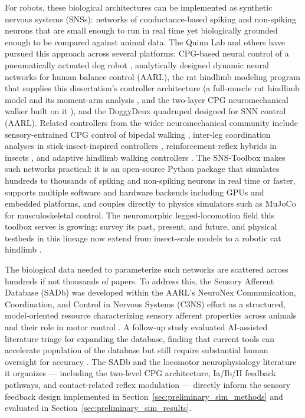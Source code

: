 For robots, these biological architectures can be implemented as synthetic nervous systems (SNSs): networks of conductance-based spiking and non-spiking neurons that are small enough to run in real time yet biologically grounded enough to be compared against animal data. The Quinn Lab and others have pursued this approach across several platforms: CPG-based neural control of a pneumatically actuated dog robot \citep{hunt_development_2017}, analytically designed dynamic neural networks for human balance control \citep{hilts_dynamic_2019}(AARL), the rat hindlimb modeling program that supplies this dissertation's controller architecture (a full-muscle rat hindlimb model and its moment-arm analysis \citep{young_analyzing_2019}, and the two-layer CPG neuromechanical walker built on it \citep{deng_neuromechanical_2019}), and the DoggyDeux quadruped designed for SNN control \citep{scharzenberger_design_2019}(AARL). Related controllers from the wider neuromechanical community include sensory-entrained CPG control of bipedal walking \citep{li_bipedal_2017}, inter-leg coordination analyses in stick-insect-inspired controllers \citep{nourse_analyzing_2019}, reinforcement-reflex hybrids in insects \citep{goldsmith_investigating_2021}, and adaptive hindlimb walking controllers \citep{schilling_adaptive_2022}. The SNS-Toolbox \citep{nourse_sns_2023} makes such networks practical: it is an open-source Python package that simulates hundreds to thousands of spiking and non-spiking neurons in real time or faster, supports multiple software and hardware backends including GPUs and embedded platforms, and couples directly to physics simulators such as MuJoCo for musculoskeletal control. The neuromorphic legged-locomotion field this toolbox serves is growing: \citet{szczecinski_perspective_2023} survey its past, present, and future, and physical testbeds in this lineage now extend from insect-scale models to a robotic cat hindlimb \citep{armstead_design_2025}.

The biological data needed to parameterize such networks are scattered across hundreds if not thousands of papers. To address this, the Sensory Afferent Database (SADb) was developed within the AARL's NeuroNex Communication, Coordination, and Control in Nervous Systems (C3NS) effort as a structured, model-oriented resource characterizing sensory afferent properties across animals and their role in motor control \citep{bolen_sensory_2023}. A follow-up study evaluated AI-assisted literature triage for expanding the database, finding that current tools can accelerate population of the database but still require substantial human oversight for accuracy \citep{bolen_using_2024}. The SADb and the locomotor neurophysiology literature it organizes --- including the two-level CPG architecture, Ia/Ib/II feedback pathways, and contact-related reflex modulation --- directly inform the sensory feedback design implemented in Section~\ref{sec:preliminary_sim_methods} and evaluated in Section~\ref{sec:preliminary_sim_results}.

